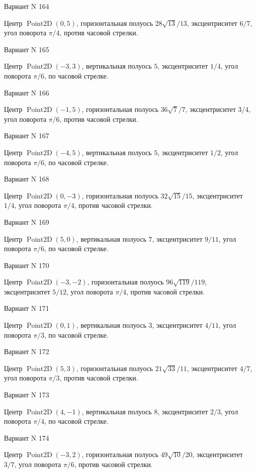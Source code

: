 \documentclass[11pt]{report}
\begin{document}
Вариант N 164

Центр $\operatorname{Point2D}\left(0, 5\right)$, горизонтальная полуось $28 \sqrt{13} / 13$, эксцентриситет $6 / 7$, угол поворота $\pi / 4$, против часовой стрелки.

Вариант N 165

Центр $\operatorname{Point2D}\left(-3, 3\right)$, вертикальная полуось $5$, эксцентриситет $1 / 4$, угол поворота $\pi / 6$, по часовой стрелке.

Вариант N 166

Центр $\operatorname{Point2D}\left(-1, 5\right)$, горизонтальная полуось $36 \sqrt{7} / 7$, эксцентриситет $3 / 4$, угол поворота $\pi / 6$, против часовой стрелки.

Вариант N 167

Центр $\operatorname{Point2D}\left(-4, 5\right)$, вертикальная полуось $5$, эксцентриситет $1 / 2$, угол поворота $\pi / 6$, по часовой стрелке.

Вариант N 168

Центр $\operatorname{Point2D}\left(0, -3\right)$, горизонтальная полуось $32 \sqrt{15} / 15$, эксцентриситет $1 / 4$, угол поворота $\pi / 4$, против часовой стрелки.

Вариант N 169

Центр $\operatorname{Point2D}\left(5, 0\right)$, вертикальная полуось $7$, эксцентриситет $9 / 11$, угол поворота $\pi / 6$, по часовой стрелке.

Вариант N 170

Центр $\operatorname{Point2D}\left(-3, -2\right)$, горизонтальная полуось $96 \sqrt{119} / 119$, эксцентриситет $5 / 12$, угол поворота $\pi / 4$, против часовой стрелки.

Вариант N 171

Центр $\operatorname{Point2D}\left(0, 1\right)$, вертикальная полуось $3$, эксцентриситет $4 / 11$, угол поворота $\pi / 3$, по часовой стрелке.

Вариант N 172

Центр $\operatorname{Point2D}\left(5, 3\right)$, горизонтальная полуось $21 \sqrt{33} / 11$, эксцентриситет $4 / 7$, угол поворота $\pi / 3$, против часовой стрелки.

Вариант N 173

Центр $\operatorname{Point2D}\left(4, -1\right)$, вертикальная полуось $8$, эксцентриситет $2 / 3$, угол поворота $\pi / 4$, по часовой стрелке.

Вариант N 174

Центр $\operatorname{Point2D}\left(-3, 2\right)$, горизонтальная полуось $49 \sqrt{10} / 20$, эксцентриситет $3 / 7$, угол поворота $\pi / 6$, против часовой стрелки.
\end{document}
